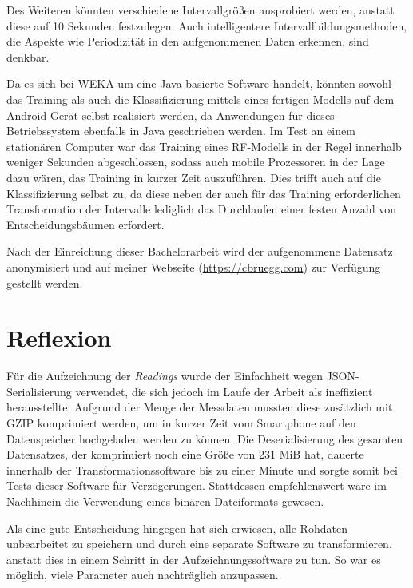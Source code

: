 Des Weiteren könnten verschiedene Intervallgrößen ausprobiert werden, anstatt diese auf 10 Sekunden festzulegen. Auch intelligentere Intervallbildungsmethoden, die Aspekte wie Periodizität in den aufgenommenen Daten erkennen, sind denkbar.

Da es sich bei WEKA um eine Java-basierte Software handelt, könnten sowohl das Training als auch die Klassifizierung mittels eines fertigen Modells auf dem Android-Gerät selbst realisiert werden, da Anwendungen für dieses Betriebssystem ebenfalls in Java geschrieben werden. Im Test an einem stationären Computer war das Training eines \acs{RF}-Modells in der Regel innerhalb weniger Sekunden abgeschlossen, sodass auch mobile Prozessoren in der Lage dazu wären, das Training in kurzer Zeit auszuführen. Dies trifft auch auf die Klassifizierung selbst zu, da diese neben der auch für das Training erforderlichen Transformation der Intervalle lediglich das Durchlaufen einer festen Anzahl von Entscheidungsbäumen erfordert.

Nach der Einreichung dieser Bachelorarbeit wird der aufgenommene Datensatz anonymisiert und auf meiner Webseite (\url{https://cbruegg.com}) zur Verfügung gestellt werden.

\section{Reflexion}
Für die Aufzeichnung der \textit{Readings} wurde der Einfachheit wegen \acs{JSON}-Serialisierung verwendet, die sich jedoch im Laufe der Arbeit als ineffizient herausstellte. Aufgrund der Menge der Messdaten mussten diese zusätzlich mit \acs{GZIP} komprimiert werden, um in kurzer Zeit vom Smartphone auf den Datenspeicher hochgeladen werden zu können. Die Deserialisierung des gesamten Datensatzes, der komprimiert noch eine Größe von 231 MiB hat, dauerte innerhalb der Transformationssoftware bis zu einer Minute und sorgte somit bei Tests dieser Software für Verzögerungen. Stattdessen empfehlenswert wäre im Nachhinein die Verwendung eines binären Dateiformats gewesen.

Als eine gute Entscheidung hingegen hat sich erwiesen, alle Rohdaten unbearbeitet zu speichern und durch eine separate Software zu transformieren, anstatt dies in einem Schritt in der Aufzeichnungssoftware zu tun. So war es möglich, viele Parameter auch nachträglich anzupassen.


